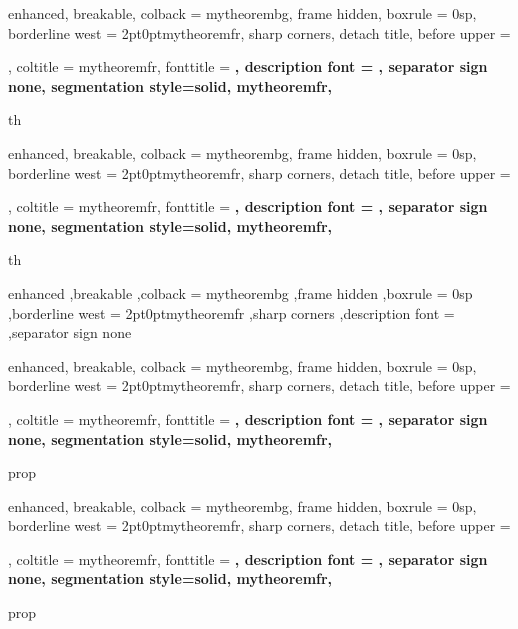 \renewcommand{\qed}{\ensuremath{\blacksquare}}





{%
	enhanced,
	breakable,
	colback = mytheorembg,
	frame hidden,
	boxrule = 0sp,
	borderline west = {2pt}{0pt}{mytheoremfr},
	sharp corners,
	detach title,
	before upper = \tcbtitle\par\smallskip,
	coltitle = mytheoremfr,
	fonttitle = \bfseries\sffamily,
	description font = \mdseries,
	separator sign none,
	segmentation style={solid, mytheoremfr},
}
{th}

{%
	enhanced,
	breakable,
	colback = mytheorembg,
	frame hidden,
	boxrule = 0sp,
	borderline west = {2pt}{0pt}{mytheoremfr},
	sharp corners,
	detach title,
	before upper = \tcbtitle\par\smallskip,
	coltitle = mytheoremfr,
	fonttitle = \bfseries\sffamily,
	description font = \mdseries,
	separator sign none,
	segmentation style={solid, mytheoremfr},
}
{th}


{%
	enhanced
	,breakable
	,colback = mytheorembg
	,frame hidden
	,boxrule = 0sp
	,borderline west = {2pt}{0pt}{mytheoremfr}
	,sharp corners
	,description font = \mdseries
	,separator sign none
}


{%
	enhanced,
	breakable,
	colback = mytheorembg,
	frame hidden,
	boxrule = 0sp,
	borderline west = {2pt}{0pt}{mytheoremfr},
	sharp corners,
	detach title,
	before upper = \tcbtitle\par\smallskip,
	coltitle = mytheoremfr,
	fonttitle = \bfseries\sffamily,
	description font = \mdseries,
	separator sign none,
	segmentation style={solid, mytheoremfr},
}
{prop}

{%
	enhanced,
	breakable,
	colback = mytheorembg,
	frame hidden,
	boxrule = 0sp,
	borderline west = {2pt}{0pt}{mytheoremfr},
	sharp corners,
	detach title,
	before upper = \tcbtitle\par\smallskip,
	coltitle = mytheoremfr,
	fonttitle = \bfseries\sffamily,
	description font = \mdseries,
	separator sign none,
	segmentation style={solid, mytheoremfr},
}
{prop}


